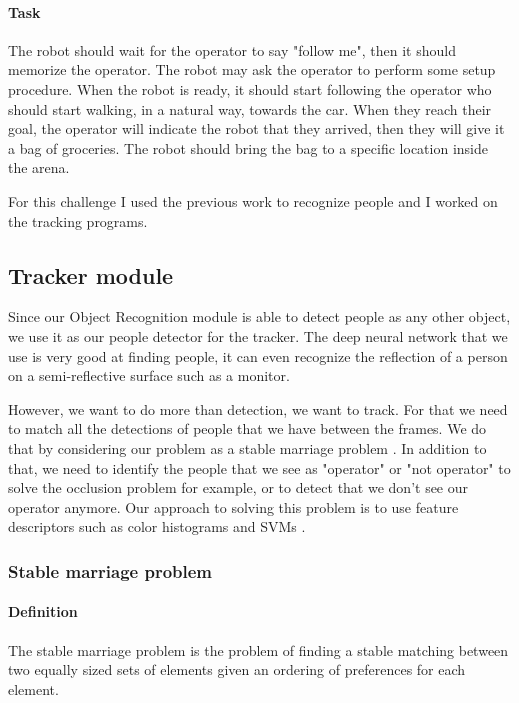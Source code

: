 \documentclass[a4paper, twocolumn]{article}
\begin{document}
    \paragraph{Task} The robot should wait for the operator to say "follow me", then it should memorize the operator. The robot may ask the operator to perform some setup procedure. When the robot is ready, it should start following the operator who should start walking, in a natural way, towards the car. When they reach their goal, the operator will indicate the robot that they arrived, then they will give it a bag of groceries. The robot should bring the bag to a specific location inside the arena.

    For this challenge I used the previous work to recognize people and I worked on the tracking programs.

    \subsection{Tracker module}

    Since our Object Recognition module is able to detect people as any other object, we use it as our people detector for the tracker. The deep neural network that we use is very good at finding people, it can even recognize the reflection of a person on a semi-reflective surface such as a monitor.

    However, we want to do more than detection, we want to track. For that we need to match all the detections of people that we have between the frames. We do that by considering our problem as a stable marriage problem \cite{gale62a}. In addition to that, we need to identify the people that we see as "operator" or "not operator" to solve the occlusion problem for example, or to detect that we don't see our operator anymore.
    Our approach to solving this problem is to use feature descriptors such as color histograms and SVMs \cite{Cortes1995}. 

    \subsubsection{Stable marriage problem}

    \paragraph{Definition} The stable marriage problem is the problem of finding a stable matching between two equally sized sets of elements given an ordering of preferences for each element.
\end{document}
